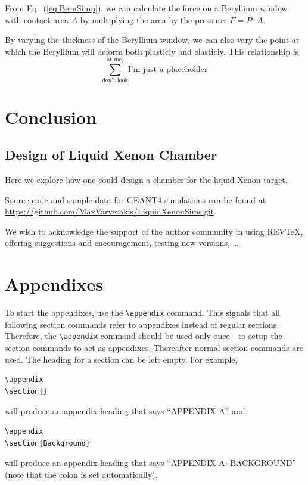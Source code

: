\documentclass[%
reprint,
amsmath, amssymb,
aps,
floatfix,
]{revtex4-2}
\begin{document}
From Eq.~(\ref{eq:BernSimp}), we can calculate the force on a Beryllium window with contact area $A$ by 
multiplying the area by the pressure: $F = P\cdot A$.

By varying the thickness of the Beryllium window, we can also vary the
point at which the Beryllium will deform both plasticly and elasticly.
This relationship is
\begin{equation}
    \sum_\textrm{don't look}^\textrm{at me,}\textrm{I'm just a placeholder}
    \label{eq:Thickness}
\end{equation}


\section{Conclusion}
\subsection{Design of Liquid Xenon Chamber}
Here we explore how one could design a chamber for the liquid Xenon target.

Source code and sample data for GEANT4 simulations can be found at 
\url{https://github.com/MaxVarverakis/LiquidXenonSims.git}.










\begin{acknowledgments}
We wish to acknowledge the support of the author community in using
REV\TeX{}, offering suggestions and encouragement, testing new versions,
\dots.
\end{acknowledgments}

\appendix
\section{Appendixes}

To start the appendixes, use the \verb+\appendix+ command.
This signals that all following section commands refer to appendixes
instead of regular sections. Therefore, the \verb+\appendix+ command
should be used only once---to setup the section commands to act as
appendixes. Thereafter normal section commands are used. The heading
for a section can be left empty. For example,
\begin{verbatim}
\appendix
\section{}
\end{verbatim}
will produce an appendix heading that says ``APPENDIX A'' and
\begin{verbatim}
\appendix
\section{Background}
\end{verbatim}
will produce an appendix heading that says ``APPENDIX A: BACKGROUND''
(note that the colon is set automatically).
\end{document}
